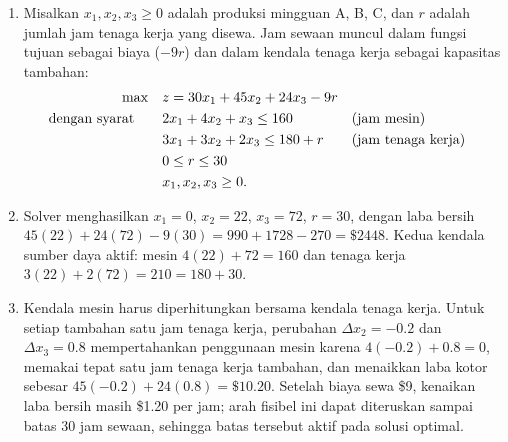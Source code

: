 \begin{enumerate}
\item Misalkan $x_1, x_2, x_3 \geq 0$ adalah produksi mingguan A, B, C, dan $r$ adalah jumlah jam tenaga kerja yang disewa. Jam sewaan muncul dalam fungsi tujuan sebagai biaya ($-9r$) dan dalam kendala tenaga kerja sebagai kapasitas tambahan:
\begin{align*}
\max \quad & z = 30x_1 + 45x_2 + 24x_3 - 9r\\
\mbox{dengan syarat}\quad \quad & 2x_1 + 4x_2 + x_3 \leq 160 && \mbox{(jam mesin)}\\
& 3x_1 + 3x_2 + 2x_3 \leq 180 + r && \mbox{(jam tenaga kerja)}\\
& 0 \leq r \leq 30\\
& x_1, x_2, x_3 \geq 0.
\end{align*}
\item Solver menghasilkan $x_1 = 0$, $x_2 = 22$, $x_3 = 72$, $r = 30$, dengan laba bersih $45(22) + 24(72) - 9(30) = 990 + 1728 - 270 = \$2448$. Kedua kendala sumber daya aktif: mesin $4(22) + 72 = 160$ dan tenaga kerja $3(22) + 2(72) = 210 = 180 + 30$.
\item Kendala mesin harus diperhitungkan bersama kendala tenaga kerja. Untuk setiap tambahan satu jam tenaga kerja, perubahan $\Delta x_2=-0.2$ dan $\Delta x_3=0.8$ mempertahankan penggunaan mesin karena $4(-0.2)+0.8=0$, memakai tepat satu jam tenaga kerja tambahan, dan menaikkan laba kotor sebesar $45(-0.2)+24(0.8)=\$10.20$. Setelah biaya sewa \$9, kenaikan laba bersih masih \$1.20 per jam; arah fisibel ini dapat diteruskan sampai batas 30 jam sewaan, sehingga batas tersebut aktif pada solusi optimal.
\end{enumerate}
